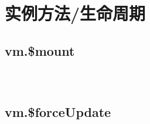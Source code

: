 \begin{lstlisting}[language=JavaScript]

\end{lstlisting}




\section{实例方法/生命周期}


\subsection{vm.\$mount}










\begin{lstlisting}[language=JavaScript]

\end{lstlisting}




\begin{lstlisting}[language=JavaScript]

\end{lstlisting}




\begin{lstlisting}[language=JavaScript]

\end{lstlisting}



\subsection{vm.\$forceUpdate}








\begin{lstlisting}[language=JavaScript]

\end{lstlisting}




\begin{lstlisting}[language=JavaScript]

\end{lstlisting}




\begin{lstlisting}[language=JavaScript]

\end{lstlisting}




